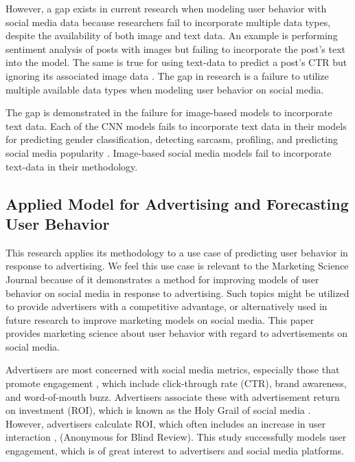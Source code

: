\documentclass[mksc,blindrev]{informs3} %
\begin{document}
However, a gap exists in current research when modeling user behavior with social media data because researchers fail to incorporate multiple data types, despite the availability of both image and text data. An example is performing sentiment analysis of posts with images \cite{Wang2015} but failing to incorporate the post's text into the model. The same is true for using text-data to predict a post's CTR but ignoring its associated image data \cite{Li2015}. The gap in research is a failure to utilize multiple available data types when modeling user behavior on social media.

The gap is demonstrated in the failure for image-based models to incorporate text data. Each of the CNN models fails to incorporate text data in their models for predicting gender classification, detecting sarcasm, profiling, and predicting social media popularity \cite{Hassner2015, Poria2016, Segalin2017, Gelli2015}. Image-based social media models fail to incorporate text-data in their methodology.

\subsection{Applied Model for Advertising and Forecasting User Behavior}

This research applies its methodology to a use case of predicting user behavior in response to advertising. We feel this use case is relevant to the Marketing Science Journal because of it demonstrates a method for improving models of user behavior on social media in response to advertising. Such topics might be utilized to provide advertisers with a competitive advantage, or alternatively used in future research to improve marketing models on social media. This paper provides marketing science about user behavior with regard to advertisements on social media.

Advertisers are most concerned with social media metrics, especially those that promote engagement \cite{Tiago2014}, which include click-through rate (CTR), brand awareness, and word-of-mouth buzz. Advertisers associate these with advertisement return on investment (ROI), which is known as the Holy Grail of social media \cite{Fisher2009}. However, advertisers calculate ROI, which often includes an increase in user interaction \cite{Romero2011}, (Anonymous for Blind Review). This study successfully models user engagement, which is of great interest to advertisers and social media platforms.  
\end{document}
